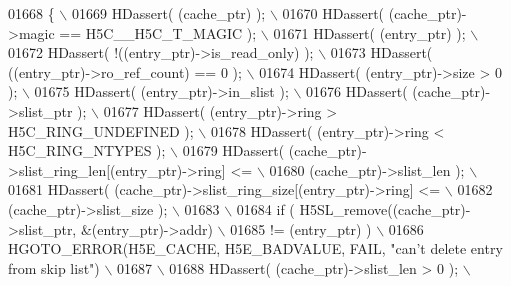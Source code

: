 \begin{DoxyCode}
01668 \textcolor{preprocessor}{\{                                                                           \(\backslash\)}
01669 \textcolor{preprocessor}{    HDassert( (cache\_ptr) );                                                \(\backslash\)}
01670 \textcolor{preprocessor}{    HDassert( (cache\_ptr)->magic == H5C\_\_H5C\_T\_MAGIC );                     \(\backslash\)}
01671 \textcolor{preprocessor}{    HDassert( (entry\_ptr) );                                                \(\backslash\)}
01672 \textcolor{preprocessor}{    HDassert( !((entry\_ptr)->is\_read\_only) );                               \(\backslash\)}
01673 \textcolor{preprocessor}{    HDassert( ((entry\_ptr)->ro\_ref\_count) == 0 );                           \(\backslash\)}
01674 \textcolor{preprocessor}{    HDassert( (entry\_ptr)->size > 0 );                                      \(\backslash\)}
01675 \textcolor{preprocessor}{    HDassert( (entry\_ptr)->in\_slist );                                      \(\backslash\)}
01676 \textcolor{preprocessor}{    HDassert( (cache\_ptr)->slist\_ptr );                                     \(\backslash\)}
01677 \textcolor{preprocessor}{    HDassert( (entry\_ptr)->ring > H5C\_RING\_UNDEFINED );                     \(\backslash\)}
01678 \textcolor{preprocessor}{    HDassert( (entry\_ptr)->ring < H5C\_RING\_NTYPES );                        \(\backslash\)}
01679 \textcolor{preprocessor}{    HDassert( (cache\_ptr)->slist\_ring\_len[(entry\_ptr)->ring] <=             \(\backslash\)}
01680 \textcolor{preprocessor}{              (cache\_ptr)->slist\_len );                                     \(\backslash\)}
01681 \textcolor{preprocessor}{    HDassert( (cache\_ptr)->slist\_ring\_size[(entry\_ptr)->ring] <=            \(\backslash\)}
01682 \textcolor{preprocessor}{              (cache\_ptr)->slist\_size );                                    \(\backslash\)}
01683 \textcolor{preprocessor}{                                                                            \(\backslash\)}
01684 \textcolor{preprocessor}{    if ( H5SL\_remove((cache\_ptr)->slist\_ptr, &(entry\_ptr)->addr)            \(\backslash\)}
01685 \textcolor{preprocessor}{             != (entry\_ptr) )                                               \(\backslash\)}
01686 \textcolor{preprocessor}{        HGOTO\_ERROR(H5E\_CACHE, H5E\_BADVALUE, FAIL, "can't delete entry from skip list") \(\backslash\)}
01687 \textcolor{preprocessor}{                                                                            \(\backslash\)}
01688 \textcolor{preprocessor}{    HDassert( (cache\_ptr)->slist\_len > 0 );                                 \(\backslash\)}

\end{DoxyCode}
